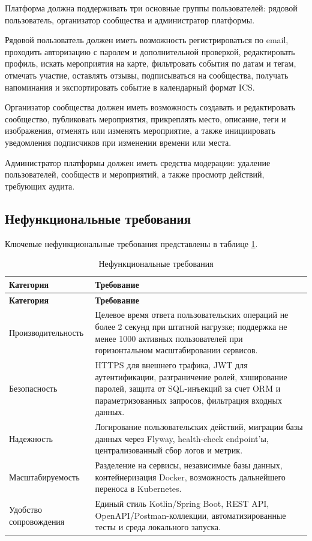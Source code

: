 Платформа должна поддерживать три основные группы пользователей: рядовой пользователь, организатор сообщества и администратор платформы.

Рядовой пользователь должен иметь возможность регистрироваться по email, проходить авторизацию с паролем и дополнительной проверкой, редактировать профиль, искать мероприятия на карте, фильтровать события по датам и тегам, отмечать участие, оставлять отзывы, подписываться на сообщества, получать напоминания и экспортировать событие в календарный формат ICS.

Организатор сообщества должен иметь возможность создавать и редактировать сообщество, публиковать мероприятия, прикреплять место, описание, теги и изображения, отменять или изменять мероприятие, а также инициировать уведомления подписчиков при изменении времени или места.

Администратор платформы должен иметь средства модерации: удаление пользователей, сообществ и мероприятий, а также просмотр действий, требующих аудита.

\subsection{Нефункциональные требования}

Ключевые нефункциональные требования представлены в таблице \ref{tab:nfr}.

\begin{longtable}{|p{4cm}|p{11cm}|}
\caption{Нефункциональные требования}\label{tab:nfr}\\
\hline
\textbf{Категория} & \textbf{Требование} \\
\hline
\endfirsthead
\hline
\textbf{Категория} & \textbf{Требование} \\
\hline
\endhead
Производительность & Целевое время ответа пользовательских операций не более 2 секунд при штатной нагрузке; поддержка не менее 1000 активных пользователей при горизонтальном масштабировании сервисов. \\
\hline
Безопасность & HTTPS для внешнего трафика, JWT для аутентификации, разграничение ролей, хэширование паролей, защита от SQL-инъекций за счет ORM и параметризованных запросов, фильтрация входных данных. \\
\hline
Надежность & Логирование пользовательских действий, миграции базы данных через Flyway, health-check endpoint'ы, централизованный сбор логов и метрик. \\
\hline
Масштабируемость & Разделение на сервисы, независимые базы данных, контейнеризация Docker, возможность дальнейшего переноса в Kubernetes. \\
\hline
Удобство сопровождения & Единый стиль Kotlin/Spring Boot, REST API, OpenAPI/Postman-коллекции, автоматизированные тесты и среда локального запуска. \\
\hline
\end{longtable}

